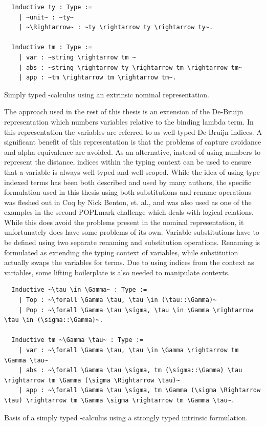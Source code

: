 \documentclass[12pt, final]{article}
\begin{document}
\begin{listing}[h]
  \begin{verbatim}
  Inductive ty : Type :=
    | ~unit~ : ~ty~
    | ~\Rightarrow~ : ~ty \rightarrow ty \rightarrow ty~.

  Inductive tm : Type :=
    | var : ~string \rightarrow tm ~
    | abs : ~string \rightarrow ty \rightarrow tm \rightarrow tm~
    | app : ~tm \rightarrow tm \rightarrow tm~.
  \end{verbatim}
  \caption{Simply typed \lambda-calculus using an extrinsic nominal representation.}
  \label{lst:nominal_stlc}
\end{listing}

The approach used in the rest of this thesis is an extension of the De-Bruijn representation which numbers variables relative to the binding lambda term.
In this representation the variables are referred to as well-typed De-Bruijn indices.
A significant benefit of this representation is that the problems of capture avoidance and alpha equivalence are avoided.
As an alternative, instead of using numbers to represent the distance, indices within the typing context can be used to ensure that a variable is always well-typed and well-scoped.
While the idea of using type indexed terms has been both described and used by many authors\cite{Altenkirch99}\cite{McBride04}\cite{Adams06}, the specific formulation used in this thesis using both substitutions and rename operations was fleshed out in Coq by Nick Benton, et. al.\cite{Benton2011}, and was also used as one of the examples in the second POPLmark challenge which deals with logical relations\cite{poplmark_reloaded}.
While this does avoid the problems present in the nominal representation, it unfortunately does have some problems of its own.
Variable substitutions have to be defined using two separate renaming and substitution operations.
Renaming is formulated as extending the typing context of variables, while substitution actually swaps the variables for terms.
Due to using indices from the context as variables, some lifting boilerplate is also needed to manipulate contexts.

\begin{listing}[h]
  \begin{verbatim}
  Inductive ~\tau \in \Gamma~ : Type :=
    | Top : ~\forall \Gamma \tau, \tau \in (\tau::\Gamma)~
    | Pop : ~\forall \Gamma \tau \sigma, \tau \in \Gamma \rightarrow \tau \in (\sigma::\Gamma)~.

  Inductive tm ~\Gamma \tau~ : Type :=
    | var : ~\forall \Gamma \tau, \tau \in \Gamma \rightarrow tm \Gamma \tau~
    | abs : ~\forall \Gamma \tau \sigma, tm (\sigma::\Gamma) \tau \rightarrow tm \Gamma (\sigma \Rightarrow \tau)~
    | app : ~\forall \Gamma \tau \sigma, tm \Gamma (\sigma \Rightarrow \tau) \rightarrow tm \Gamma \sigma \rightarrow tm \Gamma \tau~.
  \end{verbatim}
  \caption{Basis of a simply typed \lambda-calculus using a strongly typed intrinsic formulation.}
  \label{lst:strong_stlc}
\end{listing}
\end{document}
